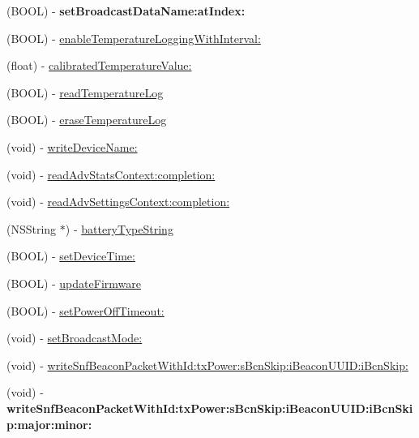 \begin{DoxyCompactItemize}
\item 
\hypertarget{interface_le_snf_device_abfc2491916c2511608e7d68f951163bb}{}(B\+O\+O\+L) -\/ {\bfseries set\+Broadcast\+Data\+Name\+:at\+Index\+:}\label{interface_le_snf_device_abfc2491916c2511608e7d68f951163bb}

\item 
(B\+O\+O\+L) -\/ \hyperlink{interface_le_snf_device_a32cce57a0f7b9253335ba0f7576ebc7f}{enable\+Temperature\+Logging\+With\+Interval\+:}
\item 
(float) -\/ \hyperlink{interface_le_snf_device_a39dffcc59e9d57552f8f847de108474a}{calibrated\+Temperature\+Value\+:}
\item 
(B\+O\+O\+L) -\/ \hyperlink{interface_le_snf_device_a4e6ee8cb46c047450dd86b1ae28879c3}{read\+Temperature\+Log}
\item 
(B\+O\+O\+L) -\/ \hyperlink{interface_le_snf_device_a89137a083145c77d4d484dc4d4e28ab6}{erase\+Temperature\+Log}
\item 
(void) -\/ \hyperlink{interface_le_snf_device_aa7d312b1ee7e42a087e841baf46732b9}{write\+Device\+Name\+:}
\item 
(void) -\/ \hyperlink{interface_le_snf_device_a815cc4d8c0d467b161d14996319a2d9d}{read\+Adv\+Stats\+Context\+:completion\+:}
\item 
(void) -\/ \hyperlink{interface_le_snf_device_a3a6a8036eef4dfba5690cad34bd273d0}{read\+Adv\+Settings\+Context\+:completion\+:}
\item 
(N\+S\+String $\ast$) -\/ \hyperlink{interface_le_snf_device_a6a19f4dd51795cd69173a7f3c5adab2e}{battery\+Type\+String}
\item 
(B\+O\+O\+L) -\/ \hyperlink{interface_le_snf_device_a8d9efd906807caddb8b349b13330c848}{set\+Device\+Time\+:}
\item 
(B\+O\+O\+L) -\/ \hyperlink{interface_le_snf_device_af245bd548bfe861a06342cfbb37383b4}{update\+Firmware}
\item 
(B\+O\+O\+L) -\/ \hyperlink{interface_le_snf_device_ad131aa4d261172fa1a61375466bf088b}{set\+Power\+Off\+Timeout\+:}
\item 
(void) -\/ \hyperlink{interface_le_snf_device_a2776ece86862b493d68de33578b96af1}{set\+Broadcast\+Mode\+:}
\item 
(void) -\/ \hyperlink{interface_le_snf_device_ab25cfa820f6bd87a3f64961a6be21a2e}{write\+Snf\+Beacon\+Packet\+With\+Id\+:tx\+Power\+:s\+Bcn\+Skip\+:i\+Beacon\+U\+U\+I\+D\+:i\+Bcn\+Skip\+:}
\item 
\hypertarget{interface_le_snf_device_a7cc7248c5898bac554fa50d9c2f7f534}{}(void) -\/ {\bfseries write\+Snf\+Beacon\+Packet\+With\+Id\+:tx\+Power\+:s\+Bcn\+Skip\+:i\+Beacon\+U\+U\+I\+D\+:i\+Bcn\+Skip\+:major\+:minor\+:}\label{interface_le_snf_device_a7cc7248c5898bac554fa50d9c2f7f534}

\end{DoxyCompactItemize}
